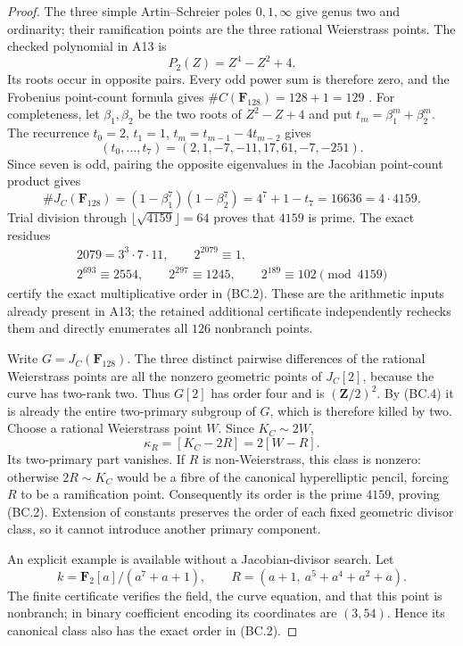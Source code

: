 \begin{proof}
The three simple Artin--Schreier poles $0,1,\infty$ give
genus two and ordinarity; their ramification points are the
three rational Weierstrass points. The checked polynomial
in A13 is
\[
                         P_2(Z)=Z^4-Z^2+4.
 \tag{BC.3}
\]
Its roots occur in opposite pairs. Every odd power sum is
therefore zero, and the Frobenius point-count formula gives
$\#C(\mathbf F_{128})=128+1=129$
\cite[Theorem~11.1]{MilneJV}.
For completeness, let $\beta_1,\beta_2$ be the two roots of
$Z^2-Z+4$ and put $t_m=\beta_1^m+\beta_2^m$.
The recurrence $t_0=2$, $t_1=1$, $t_m=t_{m-1}-4t_{m-2}$
gives
\[
               (t_0,\ldots,t_7)=(2,1,-7,-11,17,61,-7,-251).
\]
Since seven is odd, pairing the opposite eigenvalues in
the Jacobian point-count product
\cite[Theorem~19.1(b)]{MilneAV} gives
\[
 \#J_C(\mathbf F_{128})
    =(1-\beta_1^7)(1-\beta_2^7)
    =4^7+1-t_7=16636=4\cdot4159.
 \tag{BC.4}
\]
Trial division through $\lfloor\sqrt{4159}\rfloor=64$
proves that $4159$ is prime. The exact residues
\[
 \begin{gathered}
 2079=3^3\cdot7\cdot11,\qquad
 2^{2079}\equiv1,\\
 2^{693}\equiv2554,\qquad
 2^{297}\equiv1245,\qquad
 2^{189}\equiv102\pmod{4159}
 \end{gathered}
 \tag{BC.5}
\]
certify the exact multiplicative order in (BC.2).
These are the arithmetic inputs already present in A13;
the retained additional certificate independently rechecks
them and directly enumerates all $126$ nonbranch points.

Write $G=J_C(\mathbf F_{128})$. The three distinct pairwise
differences of the rational Weierstrass points are all the
nonzero geometric points of $J_C[2]$, because the curve has
two-rank two. Thus $G[2]$ has order four and is
$(\mathbf Z/2)^2$. By (BC.4) it is already the entire
two-primary subgroup of $G$, which is therefore killed by two.
Choose a rational Weierstrass point $W$. Since $K_C\sim2W$,
\[
                         \kappa_R=[K_C-2R]=2[W-R].
 \tag{BC.6}
\]
Its two-primary part vanishes. If $R$ is non-Weierstrass,
this class is nonzero: otherwise $2R\sim K_C$ would be a
fibre of the canonical hyperelliptic pencil, forcing $R$ to
be a ramification point. Consequently its order is the
prime $4159$, proving (BC.2). Extension of constants preserves
the order of each fixed geometric divisor class, so it cannot
introduce another primary component.

An explicit example is available without a Jacobian-divisor
search. Let
\[
 k=\mathbf F_2[a]/(a^7+a+1),\qquad
 R=(a+1,\ a^5+a^4+a^2+a).
 \tag{BC.7}
\]
The finite certificate verifies the field, the curve equation,
and that this point is nonbranch; in binary coefficient
encoding its coordinates are $(3,54)$. Hence its canonical
class also has the exact order in (BC.2).
\end{proof}

